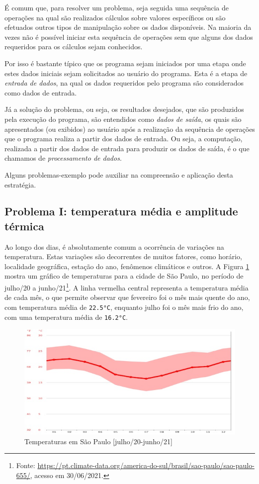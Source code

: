 \documentclass[
]{book}
\begin{document}
É comum que, para resolver um problema, seja seguida uma sequência de operações na qual são realizados cálculos sobre valores específicos ou são efetuados outros tipos de manipulação sobre os dados disponíveis. Na maioria da vezes não é possível iniciar esta sequência de operações sem que alguns dos dados requeridos para os cálculos sejam conhecidos.

Por isso é bastante típico que os programa sejam iniciados por uma etapa onde estes dados iniciais sejam solicitados ao usuário do programa. Esta é a etapa de \emph{entrada de dados}, na qual os dados requeridos pelo programa são considerados como dados de entrada.

Já a solução do problema, ou seja, os resultados desejados, que são produzidos pela execução do programa, são entendidos como \emph{dados de saída}, os quais são apresentados (ou exibidos) ao usuário após a realização da sequência de operações que o programa realiza a partir dos dados de entrada. Ou seja, a computação, realizada a partir dos dados de entrada para produzir os dados de saída, é o que chamamos de \emph{processamento de dados}.

Alguns problemas-exemplo pode auxiliar na compreensão e aplicação desta estratégia.

\hypertarget{seque-e-p-s-temper}{%
\subsection{Problema I: temperatura média e amplitude térmica}\label{seque-e-p-s-temper}}

Ao longo dos dias, é absolutamente comum a ocorrência de variações na temperatura. Estas variações são decorrentes de muitos fatores, como horário, localidade geográfica, estação do ano, fenômenos climáticos e outros. A Figura \ref{fig:04-01} mostra um gráfico de temperaturas para a cidade de São Paulo, no período de julho/20 a junho/21\footnote{Fonte: \url{https://pt.climate-data.org/america-do-sul/brasil/sao-paulo/sao-paulo-655/}, acesso em 30/06/2021.}. A linha vermelha central representa a temperatura média de cada mês, o que permite observar que fevereiro foi o mês mais quente do ano, com temperatura média de \texttt{22.5°C}, enquanto julho foi o mês mais frio do ano, com uma temperatura média de \texttt{16.2°C}.

\begin{figure}
\centering
\includegraphics{images/04-01.jpg}
\caption{\label{fig:04-01}Temperaturas em São Paulo {[}julho/20-junho/21{]}}
\end{figure}
\end{document}
